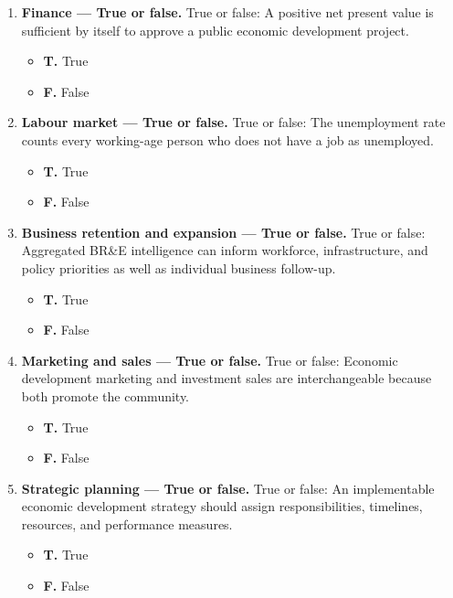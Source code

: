 \documentclass[11pt,letterpaper,oneside,openany]{book}
\begin{document}
\begin{enumerate}[leftmargin=*,itemsep=1.1em]
\item \textbf{Finance --- True or false.} True or false: A positive net present value is sufficient by itself to approve a public economic development project.
\begin{itemize}[leftmargin=1.7em]
\item \textbf{T.} True
\item \textbf{F.} False
\end{itemize}
\item \textbf{Labour market --- True or false.} True or false: The unemployment rate counts every working-age person who does not have a job as unemployed.
\begin{itemize}[leftmargin=1.7em]
\item \textbf{T.} True
\item \textbf{F.} False
\end{itemize}
\item \textbf{Business retention and expansion --- True or false.} True or false: Aggregated BR\&E intelligence can inform workforce, infrastructure, and policy priorities as well as individual business follow-up.
\begin{itemize}[leftmargin=1.7em]
\item \textbf{T.} True
\item \textbf{F.} False
\end{itemize}
\item \textbf{Marketing and sales --- True or false.} True or false: Economic development marketing and investment sales are interchangeable because both promote the community.
\begin{itemize}[leftmargin=1.7em]
\item \textbf{T.} True
\item \textbf{F.} False
\end{itemize}
\item \textbf{Strategic planning --- True or false.} True or false: An implementable economic development strategy should assign responsibilities, timelines, resources, and performance measures.
\begin{itemize}[leftmargin=1.7em]
\item \textbf{T.} True
\item \textbf{F.} False
\end{itemize}
\end{enumerate}
\end{document}
